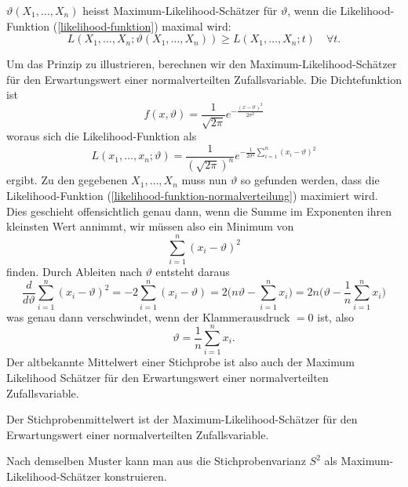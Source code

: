 \begin{definition}
$\vartheta(X_1,\dots,X_n)$ heisst Maximum-Likelihood-Schätzer für
$\vartheta$, wenn die Likelihood-Funktion (\ref{likelihood-funktion})
maximal wird:
\begin{equation}
L(X_1,\dots,X_n;\vartheta(X_1,\dots,X_n)) \ge L(X_1,\dots,X_n;t)\quad\forall t.
\end{equation}
\end{definition}

Um das Prinzip zu illustrieren, berechnen wir den
Maximum-Likelihood-Schätzer für den Erwartungswert
einer normalverteilten Zufallsvariable.
Die Dichtefunktion ist 
\[
f(x,\vartheta)=\frac1{\sqrt{2\pi}}e^{-\frac{(x-\vartheta)^2}{2\sigma^2}}
\]
woraus sich die Likelihood-Funktion als
\begin{equation}
L(x_1,\dots,x_n;\vartheta)=
\frac1{(\sqrt{2\pi})^n}e^{-\frac1{2\sigma^2}\sum_{i=1}^n(x_i-\vartheta)^2}
\label{likelihood-funktion-normalverteilung}
\end{equation}
ergibt.
Zu den gegebenen $X_1,\dots,X_n$ muss nun $\vartheta$ so gefunden
werden, dass die Likelihood-Funktion
(\ref{likelihood-funktion-normalverteilung}) maximiert wird.
Dies geschieht offensichtlich genau dann, wenn die Summe im Exponenten
ihren kleinsten Wert annimmt, wir müssen also ein Minimum von
\begin{equation}
\sum_{i=1}^n (x_i-\vartheta)^2
\end{equation}
finden.
Durch Ableiten nach $\vartheta$ entsteht daraus
\begin{equation}
\frac{d}{d\vartheta}
\sum_{i=1}^n (x_i-\vartheta)^2
=-2\sum_{i=1}^n (x_i-\vartheta)=2\biggl(n\vartheta-\sum_{i=1}^nx_i\biggr)
=2n\biggl(\vartheta-\frac1n\sum_{i=1}^nx_i\biggr)
\end{equation}
was genau dann verschwindet, wenn der Klammerausdruck $=0$ ist, also
\begin{equation}
\vartheta=\frac1n\sum_{i=1}^nx_i.
\end{equation}
Der altbekannte Mittelwert einer Stichprobe ist also auch der
Maximum Likelihood Schätzer für den Erwartungswert einer normalverteilten
Zufallsvariable.
\begin{satz}
Der Stichprobenmittelwert ist der Maximum-Likelihood-Schätzer
für den Erwartungswert einer normalverteilten Zufallsvariable.
\end{satz}
Nach demselben Muster kann man aus die Stichprobenvarianz $S^2$ als
Maximum-Likelihood-Schätzer konstruieren.

